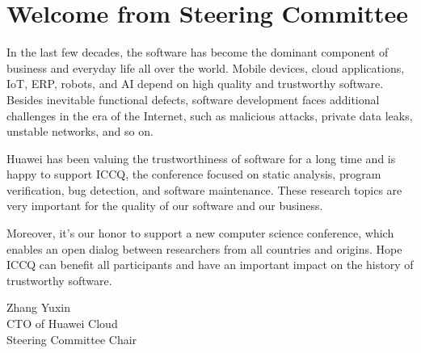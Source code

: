 \cleardoublepage
\thispagestyle{empty}
\section{Welcome from Steering Committee}

In the last few decades, the software has become the dominant component of business and everyday life all over the world. Mobile devices, cloud applications, IoT, ERP, robots, and AI depend on high quality and trustworthy software. Besides inevitable functional defects, software development faces additional challenges in the era of the Internet, such as malicious attacks, private data leaks, unstable networks, and so on.

Huawei has been valuing the trustworthiness of software for a long time and is happy to support ICCQ, the conference focused on static analysis, program verification, bug detection, and software maintenance. These research topics are very important for the quality of our software and our business.

Moreover, it's our honor to support a new computer science conference, which enables an open dialog between researchers from all countries and origins. Hope ICCQ can benefit all participants and have an important impact on the history of trustworthy software.

Zhang Yuxin \\
CTO of Huawei Cloud \\
Steering Committee Chair